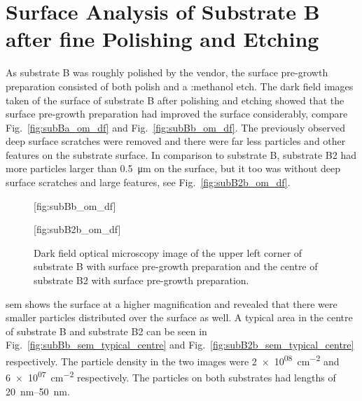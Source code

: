 \clearpage
   
\section{Surface Analysis of Substrate B after fine Polishing and Etching}

As substrate B was roughly polished by the vendor, the surface pre-growth preparation consisted of both polish and a :methanol etch. The dark field images taken of the surface of substrate B after polishing and etching showed that the surface pre-growth preparation had improved the surface considerably, compare Fig.~\ref{fig:subBa_om_df} and Fig.~\ref{fig:subBb_om_df}. The previously observed deep surface scratches were removed and there were far less particles and other features on the substrate surface. In comparison to substrate B, substrate B2 had more particles larger than \SI{0.5}{\micro\metre} on the surface, but it too was without deep surface scratches and large features, see Fig.~\ref{fig:subB2b_om_df}.

\begin{figure}[htbp]
    \centering
    [fig:subBb_om_df]
    \par\bigskip
    [fig:subB2b_om_df]
    \caption[Dark field optical microscopy image of substrate B and B2 with surface pre-growth preparation.]{Dark field optical microscopy image of  the upper left corner of substrate B with surface pre-growth preparation and  the centre of substrate B2 with surface pre-growth preparation.}\label{fig:subBb_and_subB2b_om_df}
\end{figure}

\Ac{sem} shows the surface at a higher magnification and revealed that there were smaller particles distributed over the surface as well. A typical area in the centre of substrate B and substrate B2 can be seen in Fig.~\ref{fig:subBb_sem_typical_centre} and Fig.~\ref{fig:subB2b_sem_typical_centre} respectively. The particle density in the two images were \SI{2e+08}{\centi\metre^{-2}} and \SI{6e+07}{\centi\metre^{-2}} respectively. The particles on both substrates had lengths of \SIrange{20}{50}{\nano\metre}. 

